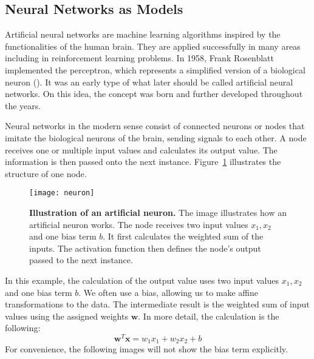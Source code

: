 \subsection{Neural Networks as Models}
\label{subsec:NN}
Artificial neural networks are machine learning algorithms inspired by the functionalities of the human brain. They are applied successfully in many areas including in reinforcement learning problems. In 1958, Frank Rosenblatt implemented the perceptron, which represents a simplified version of a biological neuron (\cite{rosenblatt1958perceptron}). It was an early type of what later should be called artificial neural networks. On this idea, the concept was born and further developed throughout the years.

Neural networks in the modern sense consist of connected neurons or nodes that imitate the biological neurons of the brain, sending signals to each other. A node receives one or multiple input values and calculates its output value. The information is then passed onto the next instance. Figure~\ref{fig:neuron} illustrates the structure of one node.
\begin{figure}[ht]
\centering
\texttt{[image: neuron]}
\caption[Illustration of an artificial neuron]{
  \textbf{Illustration of an artificial neuron.}
  The image illustrates how an artificial neuron works. The node receives two input values $x_1, x_2$ and one bias term $b$. It first calculates the weighted sum of the inputs. The activation function then defines the node's output passed to the next instance.
}
\label{fig:neuron}
\end{figure}
In this example, the calculation of the output value uses two input values $x_1, x_2$ and one bias term $b$. We often use a bias, allowing us to make affine transformations to the data. The intermediate result is the weighted sum of input values using the assigned weights $\mathbf{w}$. In  more detail, the calculation is the following:
\[
  \mathbf{w}^T \mathbf{x} = w_1 x_1 + w_2 x_2 + b
\]
For convenience, the following images will not show the bias term explicitly.

